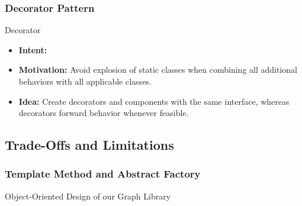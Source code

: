 \subsubsection{Decorator Pattern}
\begin{frame}{\myframetitle}
	\begin{mycolumns}[widths={45}]
		\begin{definition}{Decorator }
			\begin{itemize}
				\item {\bf Intent:} 
				\item {\bf Motivation:} Avoid explosion of static classes when combining all additional behaviors with all applicable classes.
				\item {\bf Idea:} Create decorators and components with the same interface, whereas decorators forward behavior whenever feasible.
			\end{itemize}
		\end{definition}
	\mynextcolumn
		\begin{exampletight}{}
		\end{exampletight}
	\end{mycolumns}
\end{frame}

\subsection{Trade-Offs and Limitations}

\subsubsection{Template Method and Abstract Factory}
\begin{frame}{Object-Oriented Design of our Graph Library}
	\begin{mycolumns}[widths={40}]
	\mynextcolumn
	\end{mycolumns}
\end{frame}

